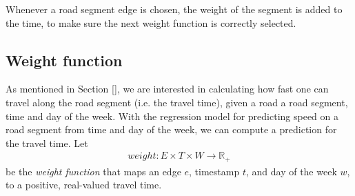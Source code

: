 Whenever a road segment edge is chosen, the weight of the segment is added to the time, to make sure the next weight function is correctly selected. 






\subsection{Weight function}\label{sec:weight-function}
As mentioned in Section \ref{}, we are interested in calculating how fast one can travel along the road segment (i.e. the travel time), given a road a road segment, time and day of the week. With the regression model for predicting speed on a road segment from time and day of the week, we can compute a prediction for the travel time. Let
\begin{align}
weight: E \times T \times W \rightarrow \mathbb{R_+}
\end{align}
be the \emph{weight function} that maps an edge $e$, timestamp $t$, and day of the week $w$, to a positive, real-valued travel time.

